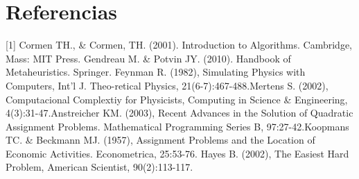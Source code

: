 \documentclass{article}
\begin{document}
 \section{Referencias}
[1] Cormen TH., \& Cormen, TH. (2001). Introduction to Algorithms. Cambridge, Mass: MIT Press. \newline\newline
[2] Gendreau M. \& Potvin JY. (2010). Handbook of Metaheuristics. Springer. \newline\newline
[3] Feynman R. (1982), Simulating Physics with Computers, Int’l J. Theo-retical Physics, 21(6-7):467-488.\newline\newline
[4] Mertens S. (2002), Computacional Complextiy for Physicists, Computing in Science \& Engineering, 4(3):31-47.\newline\newline
[5] Anstreicher KM. (2003), Recent Advances in the Solution of Quadratic Assignment Problems. Mathematical Programming Series B, 97:27-42.\newline\newline
[6] Koopmans TC. \& Beckmann MJ. (1957), Assignment Problems and the Location of Economic Activities. Econometrica, 25:53-76. \newline\newline
[7] Hayes B. (2002), The Easiest Hard Problem, American Scientist, 90(2):113-117.\newline\newline\newline\newline
\end{document}
